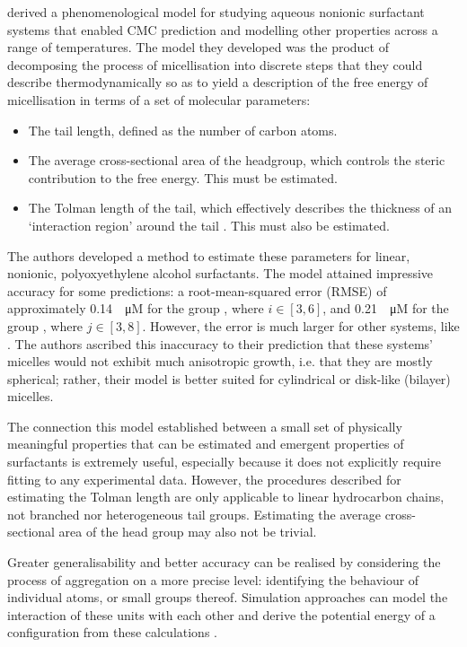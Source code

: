 \citet{puvvadaMolecularThermodynamicApproach1990} derived a phenomenological
model for studying aqueous nonionic surfactant systems that enabled CMC
prediction and modelling other properties across a range of temperatures. The
model they developed was the product of decomposing the process of micellisation
into discrete steps that they could describe thermodynamically so as to yield a
description of the free energy of micellisation in terms of a set of molecular
parameters:

\begin{itemize}
    \item The tail length, defined as the number of carbon atoms.
    \item The average cross-sectional area of the headgroup, which controls the
          steric contribution to the free energy. This must be estimated.
    \item The Tolman length of the tail, which effectively describes the
          thickness of an `interaction region' around the tail
          \cite{demiguelGibbsThermodynamicsSurface2021}. This must also be estimated.
\end{itemize}

The authors developed a method to estimate these parameters for linear,
nonionic, polyoxyethylene alcohol surfactants. The model attained impressive
accuracy for some predictions: a root-mean-squared error (RMSE) of approximately
\SI{0.14}{\log \micro M} for the group , where $i \in [3, 6]$, and
\SI{0.21}{\log \micro M} for the group , where $j \in [3, 8]$.
However, the error is much larger for other systems, like . The authors
ascribed this inaccuracy to their prediction that these systems' micelles would
not exhibit much anisotropic growth, i.e. that they are mostly spherical;
rather, their model is better suited for cylindrical or disk-like (bilayer)
micelles.

The connection this model established between a small set of physically meaningful properties that can be estimated and emergent properties of surfactants is extremely useful, especially because it does not explicitly require fitting to any experimental data. However, the procedures described for estimating the Tolman length are only applicable to linear hydrocarbon chains, not branched nor heterogeneous tail groups. Estimating the average cross-sectional area of the head group may also not be trivial.

Greater generalisability and better accuracy can be realised by considering the
process of aggregation on a more precise level: identifying the behaviour of
individual atoms, or small groups thereof. Simulation approaches can model the
interaction of these units with each other and derive the potential energy of a
configuration from these calculations
\cite{frenkelUnderstandingMolecularSimulation2001,joshiReviewAdvancementsCoarsegrained2021,filipeMolecularDynamicsSimulations2022}.

